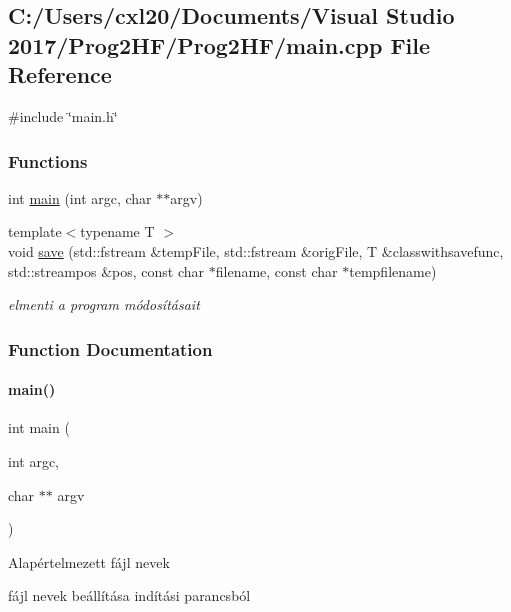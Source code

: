 \subsection{C\+:/\+Users/cxl20/\+Documents/\+Visual Studio 2017/\+Prog2\+H\+F/\+Prog2\+H\+F/main.cpp File Reference}
\label{main_8cpp}
{\ttfamily \#include \char`\"{}main.\+h\char`\"{}}\newline
\subsubsection*{Functions}
\begin{DoxyCompactItemize}
\item 
int \mbox{\hyperlink{main_8cpp_a3c04138a5bfe5d72780bb7e82a18e627}{main}} (int argc, char $\ast$$\ast$argv)
\item 
{\footnotesize template$<$typename T $>$ }\\void \mbox{\hyperlink{main_8cpp_a5f7b8c9ea0d63088ae9f9454d89b392b}{save}} (std\+::fstream \&temp\+File, std\+::fstream \&orig\+File, T \&classwithsavefunc, std\+::streampos \&pos, const char $\ast$filename, const char $\ast$tempfilename)
\begin{DoxyCompactList}\small\item\em elmenti a program módosításait \end{DoxyCompactList}\end{DoxyCompactItemize}


\subsubsection{Function Documentation}
\mbox{\label{main_8cpp_a3c04138a5bfe5d72780bb7e82a18e627}} 
\paragraph{\texorpdfstring{main()}{main()}}
{\footnotesize\ttfamily int main (\begin{DoxyParamCaption}\item[{int}]{argc,  }\item[{char $\ast$$\ast$}]{argv }\end{DoxyParamCaption})}

Alapértelmezett fájl nevek

fájl nevek beállítása indítási parancsból

